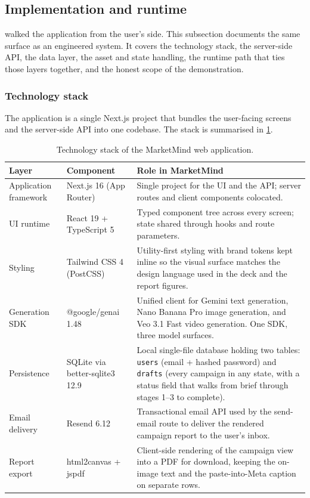 \documentclass[12pt,a4paper]{report}
\begin{document}
\subsection{Implementation and runtime}
\label{sec:webapp}

 walked the application from the user's side. This subsection documents the same surface as an engineered system. It covers the technology stack, the server-side API, the data layer, the asset and state handling, the runtime path that ties those layers together, and the honest scope of the demonstration.

\subsubsection{Technology stack}
\label{sec:webstack}

The application is a single Next.js project that bundles the user-facing screens and the server-side API into one codebase. The stack is summarised in \cref{tab:webstack}.

\begin{table}[ht!]
  \centering
  \caption{Technology stack of the MarketMind web application.}
  \label{tab:webstack}
  \small
  \begin{tabular}{@{}>{\raggedright\arraybackslash}p{1.8in}>{\raggedright\arraybackslash}p{1.3in}>{\raggedright\arraybackslash}p{2.6in}@{}}
    \toprule
    Layer & Component & Role in MarketMind \\
    \midrule
    Application framework & Next.js 16 (App Router) & Single project for the UI and the API; server routes and client components colocated. \\
    \addlinespace
    UI runtime & React 19 + TypeScript 5 & Typed component tree across every screen; state shared through hooks and route parameters. \\
    \addlinespace
    Styling & Tailwind CSS 4 (PostCSS) & Utility-first styling with brand tokens kept inline so the visual surface matches the design language used in the deck and the report figures. \\
    \addlinespace
    Generation SDK & @google/genai 1.48 & Unified client for Gemini text generation, Nano Banana Pro image generation, and Veo 3.1 Fast video generation. One SDK, three model surfaces. \\
    \addlinespace
    Persistence & SQLite via better-sqlite3 12.9 & Local single-file database holding two tables: \texttt{users} (email + hashed password) and \texttt{drafts} (every campaign in any state, with a status field that walks from brief through stages 1--3 to complete). \\
    \addlinespace
    Email delivery & Resend 6.12 & Transactional email API used by the send-email route to deliver the rendered campaign report to the user's inbox. \\
    \addlinespace
    Report export & html2canvas + jspdf & Client-side rendering of the campaign view into a PDF for download, keeping the on-image text and the paste-into-Meta caption on separate rows. \\
    \bottomrule
  \end{tabular}
\end{table}
\end{document}
